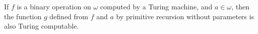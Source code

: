 If $f$ is a binary operation on $\omega$ computed by a Turing machine, and $a \in \omega$, then the function $g$ defined from $f$ and $a$ by primitive recursion without parameters is also Turing computable.
